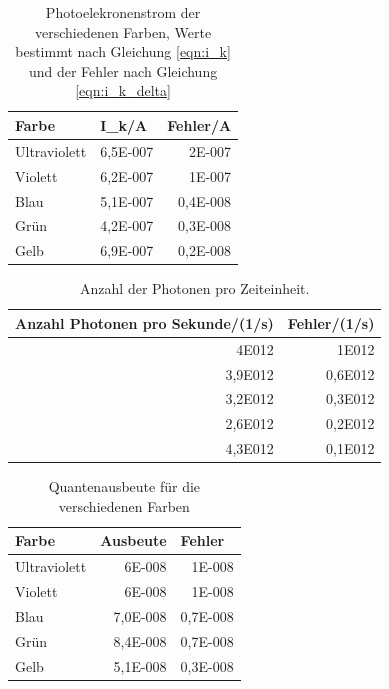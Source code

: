 \documentclass[12px]{scrartcl}
\begin{document}
\begin{table}[H]
\caption{Photoelekronenstrom der verschiedenen Farben, Werte bestimmt nach Gleichung \ref{eqn:i_k} und der Fehler nach Gleichung \ref{eqn:i_k_delta}}
\begin{center}
\begin{tabular}{|l|r|r|}
\hline
Farbe & \multicolumn{1}{l|}{I\_k/A} & \multicolumn{1}{l|}{Fehler/A} \\ \hline
Ultraviolett & 6,5E-007 & 2E-007 \\ \hline
Violett & 6,2E-007 & 1E-007 \\ \hline
Blau & 5,1E-007 & 0,4E-008 \\ \hline
Grün & 4,2E-007 & 0,3E-008 \\ \hline
Gelb & 6,9E-007 & 0,2E-008 \\ \hline
\end{tabular}
\end{center}
\label{tab:i_k}
\end{table}

\begin{table}[H]
\caption{Anzahl der Photonen pro Zeiteinheit.}
\begin{center}
\begin{tabular}{|r|r|}
\hline
\multicolumn{1}{|l|}{Anzahl Photonen pro Sekunde/(1/s)} & \multicolumn{1}{l|}{Fehler/(1/s)} \\ \hline
4E012 & 1E012 \\ \hline
3,9E012 & 0,6E012 \\ \hline
3,2E012 & 0,3E012 \\ \hline
2,6E012 & 0,2E012 \\ \hline
4,3E012 & 0,1E012 \\ \hline
\end{tabular}
\end{center}
\label{tab:a_2_3_a}
\end{table}

\begin{table}[htbp]
\caption{Quantenausbeute für die verschiedenen Farben}
\centering
\begin{tabular}{|l|r|r|}
\hline
Farbe & \multicolumn{1}{l|}{Ausbeute} & \multicolumn{1}{l|}{Fehler} \\ \hline
Ultraviolett & 6E-008 & 1E-008 \\ \hline
Violett & 6E-008 & 1E-008 \\ \hline
Blau & 7,0E-008 & 0,7E-008 \\ \hline
Grün & 8,4E-008 & 0,7E-008 \\ \hline
Gelb & 5,1E-008 & 0,3E-008 \\ \hline
\end{tabular}
\label{tab:ausbeute}
\end{table}
\end{document}
